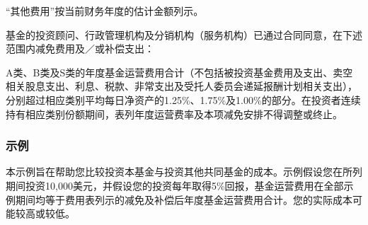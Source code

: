 \documentclass[UTF8,fontset=none,11pt,a4paper]{ctexart}
\begin{document}
 “其他费用”按当前财务年度的估计金额列示。\par\smallskip
{} 基金的投资顾问、行政管理机构及分销机构（服务机构）已通过合同同意，在下述范围内减免费用及／或补偿支出：\par\smallskip
A类、B类及S类的年度基金运营费用合计（不包括被投资基金费用及支出、卖空相关股息支出、利息、税款、非常支出及受托人委员会递延报酬计划相关支出），分别超过相应类别平均每日净资产的1.25\%、1.75\%及1.00\%的部分。在投资者连续持有相应类别份额期间，表列年度运营费率及本项减免安排不得调整或终止。


\subsubsection*{示例}
本示例旨在帮助您比较投资本基金与投资其他共同基金的成本。示例假设您在所列期间投资10,000美元，并假设您的投资每年取得5\%回报，基金运营费用在全部示例期间均等于费用表列示的减免及补偿后年度基金运营费用合计。您的实际成本可能较高或较低。
\end{document}
